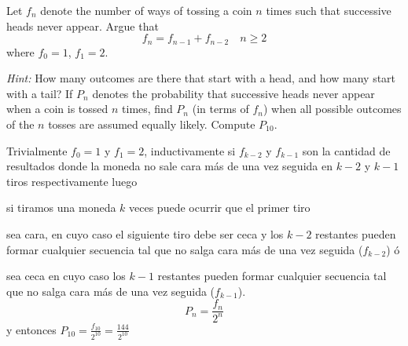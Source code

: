  \item Let $f_n$ denote the number of ways of tossing a coin $n$ times such that successive heads never appear. Argue that 
 \[f_n = f_{n-1} + f_{n-2}\quad n \ge 2\]
 where $f_0 = 1$, $f_1 = 2$.
 
\emph{Hint:} How many outcomes are there that start with a head, and how many start with a tail? If $P_n$ denotes the probability that successive heads never appear when a coin is tossed $n$ times, find $P_n$ (in terms of $f_n$) when all possible outcomes of the $n$ tosses are assumed equally likely. Compute $P_{10}$.

Trivialmente $f_0 = 1$ y $f_1 = 2$, inductivamente si $f_{k-2}$ y $f_{k-1}$ son la cantidad de resultados donde la moneda no sale cara más de una vez seguida en $k-2$ y $k-1$ tiros respectivamente luego

si tiramos una moneda $k$ veces puede ocurrir que el primer tiro

sea cara, en cuyo caso el siguiente tiro debe ser ceca y los $k-2$ restantes pueden formar cualquier secuencia tal que no salga cara más de una vez seguida ($f_{k-2}$) ó

sea ceca en cuyo caso los $k-1$ restantes pueden formar cualquier secuencia tal que no salga cara más de una vez seguida ($f_{k-1}$).
\[P_n = \frac{f_n}{2^n} \]
y entonces $P_{10} = \frac{f_{10}}{2^{10}} = \frac{144}{2^{10}}$